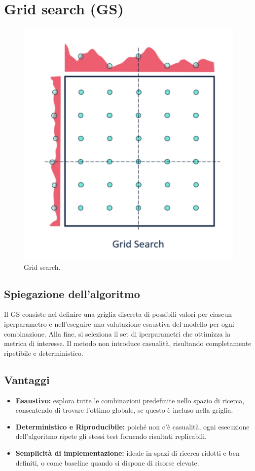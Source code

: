 \documentclass[a4paper,12pt]{report}
\begin{document}
	\section{Grid search (GS)}
	\begin{figure}[H]
		\centering
		\includegraphics[width=1.0\textwidth]{img/gs.png}
		\caption{Grid search.}
	\end{figure}
	\subsection{Spiegazione dell'algoritmo}
	Il GS consiste nel definire una griglia discreta di possibili valori per ciascun iperparametro e nell'eseguire una valutazione esaustiva del modello per ogni combinazione. Alla fine, si seleziona il set di iperparametri che ottimizza la metrica di interesse. Il metodo non introduce casualità, risultando completamente ripetibile e deterministico.
	
	\subsection{Vantaggi}
	\begin{itemize}
		\item \textbf{Esaustivo:} esplora tutte le combinazioni predefinite nello spazio di ricerca, consentendo di trovare l’ottimo globale, se questo è incluso nella griglia.
		\item \textbf{Deterministico e Riproducibile:} poiché non c'è casualità, ogni esecuzione dell'algoritmo ripete gli stessi test fornendo risultati replicabili.
		\item \textbf{Semplicità di implementazione:} ideale in spazi di ricerca ridotti e ben definiti, o come baseline quando si dispone di risorse elevate.
	\end{itemize}
	
\end{document}
